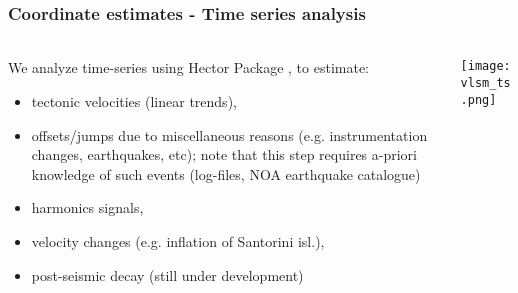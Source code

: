\begin{frame}
  \frametitle{Coordinate estimates - Time series analysis}
  \framesubtitle{}
  \label{}
  \vskip-1cm
  \begin{columns}[T]
    \begin{column}{.4\textwidth}
      \footnotesize{
      We analyze time-series using Hector Package \citep{Bos2012}, to estimate:
      \begin{itemize}
        \item tectonic velocities (linear trends),
        \item offsets/jumps due to miscellaneous reasons (e.g. instrumentation 
          changes, earthquakes, etc); note that this step requires a-priori 
          knowledge of such events (log-files, NOA earthquake catalogue)
        \item harmonics signals,
        \item velocity changes (e.g. inflation of Santorini isl.),
        \item post-seismic decay (still under development)
      \end{itemize}}
    \end{column}
    \begin{column}{.6\textwidth}
      \begin{center}
        \texttt{[image: vlsm\_ts.png]}
      \end{center}
    \end{column}
  \end{columns}
 
\end{frame}
\note{}

